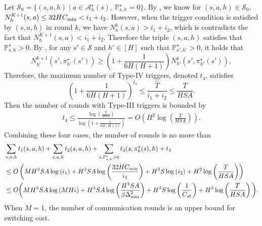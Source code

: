 \documentclass{article}
\def\dmin{\Delta_{\textnormal{min}}}
\begin{document}
    Let $\mathcal{S}_0 = \{(s,a,h) \mid a \in \mathcal{A}_h^{\star}(s),\ \mathbb{P}_{s,h}^{\star} = 0\}$. By , we know for $(s,a,h) \in \mathcal{S}_0$, $N_h^{K+1}(s,a) \leq 32HC_{\textnormal{min}} < i_1+i_2$. However, when the trigger condition is satisfied by $(s,a,h)$ in round $k$, we have $N_h^k(s,a) > i_1 + i_2 $, which is contradicts the fact that $N_h^{K+1}(s,a) < i_1+i_2$. Therefore the triple $(s,a,h)$ satisfies that $\mathbb{P}_{s,h}^{\star} > 0$. By , for any $s' \in \mathcal{S}$ and $h' \in [H]$ such that $\mathbb{P}_{s',h'}^{\star} > 0$, it holds that
    $$N_{h'}^{k+1}(s',\pi_{h'}^{\star}(s')) \geq \left(1 +\frac{1}{6H(H+1)}\right)N_{h'}^k(s',\pi_{h'}^{\star}(s')),$$
    Therefore, the maximum number of Type-IV triggers, denoted $t_{4}$, satisfies 
    $$ \left( 1+ \frac{1}{6H(H+1)}\right)^{t_{4}} \leq \frac{\hat{T}}{i_1+i_2} \leq \frac{T}{HSA}.$$
    Then the number of rounds with Type-III triggers is bounded by
    \begin{align*}
        t_{4} \leq \frac{\log(\frac{T}{HSA})}{\log\left(1+ \frac{1}{6H(H+1)}\right)}= O\left(H^2\log\left(\frac{T}{HSA}\right)\right) .
    \end{align*}
Combining these four cases, the number of rounds is no more than
\begin{align*}
    &\sum_{s,a,h }t_1(s,a,h) + \sum_{s,a,h }t_{2}(s,a,h) + \sum_{s,\mathbb{P}_{s,h}^{\star} >0 }t_{3}(s,\pi_h^{\star}(s),h)+ t_{4} \nonumber\\
    & \leq O \left( MH^3SA\log\left(i_1\right)+ H^3SA\log\left(\frac{32HC_{\textnormal{min}}}{i_1}\right)+H^3S\log\left(i_2\right)  +H^2\log\left(\frac{T}{HSA}\right) \right) \\
    & \leq O \bigg( MH^3SA\log\left(MH\iota\right)+ H^3SA\log\left(\frac{H^4SA}{\beta\dmin^2}\right)   +H^3S\log\left(\frac{1}{C_{st}}\right)  +H^2\log\left(\frac{T}{HSA}\right) \bigg).
\end{align*}
When $M=1$, the number of communication rounds is an upper bound for switching cost.
\end{document}
